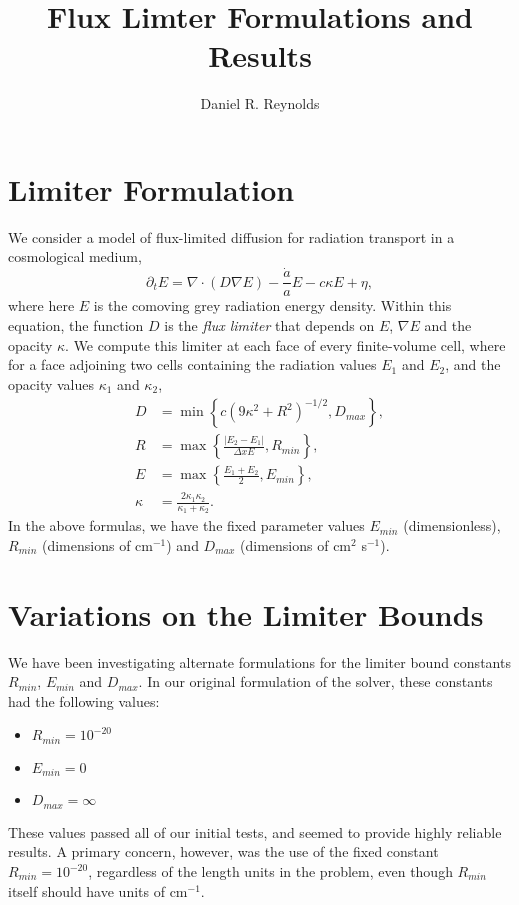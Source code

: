 \documentclass[letterpaper,11pt]{article}
\author{Daniel R. Reynolds}
\title{Flux Limter Formulations and Results}
\begin{document}
\maketitle

\section{Limiter Formulation}
\label{sec:model}

We consider a model of flux-limited diffusion for radiation transport
in a cosmological medium,
\begin{equation}
\label{eq:FLD_eqn}
  \partial_t E = \nabla\cdot\left(D\nabla E\right) - \frac{\dot{a}}{a}E - c \kappa E + \eta,
\end{equation}
where here $E$ is the comoving grey radiation energy density.  Within
this equation, the function $D$ is the {\em flux limiter} that depends on $E$,
$\nabla E$ and the opacity $\kappa$.  We compute this
limiter at each face of every finite-volume cell, where for a face
adjoining two cells containing the radiation values $E_1$ and $E_2$,
and the opacity values $\kappa_1$ and $\kappa_2$,
\begin{align}
  D &= \min\left\{ c \left(9\kappa^2 + R^2\right)^{-1/2} , D_{max} \right\}, \\
  R &= \max\left\{\frac{|E_2-E_1|}{\Delta x E}, R_{min}\right\}, \\
  E &= \max\left\{ \frac{E_1+E_2}{2}, E_{min} \right\}, \\
  \kappa &= \frac{2 \kappa_1 \kappa_2}{\kappa_1 + \kappa_2}.
\end{align}
In the above formulas, we have the fixed parameter values $E_{min}$
(dimensionless), $R_{min}$ (dimensions of cm$^{-1}$) and $D_{max}$
(dimensions of cm$^2$ s$^{-1}$).




\section{Variations on the Limiter Bounds}
\label{sec:bounds}

We have been investigating alternate formulations for the limiter
bound constants $R_{min}$, $E_{min}$ and $D_{max}$.  In our original
formulation of the solver, these constants had the following values:
\begin{itemize}
\item $R_{min} = 10^{-20}$
\item $E_{min} = 0$
\item $D_{max} = \infty$
\end{itemize}
These values passed all of our initial tests, and seemed to provide
highly reliable results.  A primary concern, however, was the use of
the fixed constant $R_{min} = 10^{-20}$, regardless of the length
units in the problem, even though $R_{min}$ itself should have units
of cm$^{-1}$.
\end{document}
